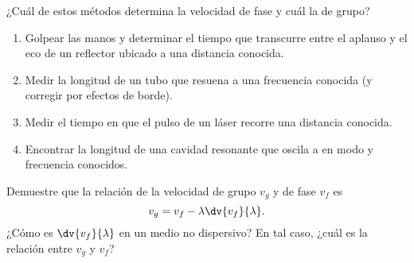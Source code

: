 \item ¿Cuál de estos métodos determina la velocidad de fase y cuál la de grupo?
\begin{enumerate}
\item Golpear las manos y determinar el tiempo que transcurre entre el aplauso y el eco de un reflector ubicado a una distancia conocida.
\item Medir la longitud de un tubo que resuena a una frecuencia conocida (y corregir por efectos de borde).
\item Medir el tiempo en que el pulso de un láser recorre una distancia conocida.
\item Encontrar la longitud de una cavidad resonante que oscila a en modo y frecuencia conocidos.
\end{enumerate}


\item Demuestre que la relación de la velocidad de grupo $v_g$ y de fase $v_f$ es
$$
v_g = v_f - \lambda \dv{v_f}{\lambda}.
$$
¿Cómo es $\dv{v_f}{\lambda}$ en un medio no dispersivo?
En tal caso, ¿cuál es la relación entre $v_g$ y $v_f$?

